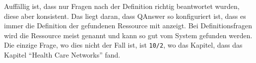 Auffällig ist, dass nur Fragen nach der Definition richtig beantwortet wurden, diese aber konsistent.
Das liegt daran, dass QAnswer so konfiguriert ist, dass es immer die Definition der gefundenen Ressource mit anzeigt.
Bei Definitionsfragen wird die Ressource meist genannt und kann so gut vom System gefunden werden.
Die einzige Frage, wo dies nicht der Fall ist, ist \texttt{10/2}, wo das Kapitel, dass das Kapitel \enquote{Health Care Networks} fand.
